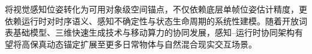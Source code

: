 \documentclass[review]{vgtc}
\begin{document}
将视觉感知位姿转化为可用对象级空间锚点，不仅依赖底层单帧位姿估计精度，更依赖运行时对时序语义、感知不确定性与状态生命周期的系统性建模。随着开放词表基础模型、三维快速生成技术与移动算力的协同发展，感知--运行时协同架构有望将高保真动态锚定扩展至更多日常物体与自然混合现实交互场景。




\end{document}
